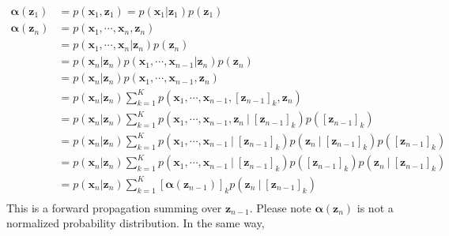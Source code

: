 \documentclass[a4]{article}
\begin{document}
\begin{equation}
\begin{aligned}
\bm{\alpha}(\bm{z}_1) &= p(\bm{x}_1, \bm{z}_1) = p(\bm{x}_1|\bm{z}_1)p(\bm{z}_1)\\
\bm{\alpha}(\bm{z}_n) &= p(\bm{x}_1, \cdots, \bm{x}_n , \bm{z}_n)\\
                      &= p(\bm{x}_1, \cdots, \bm{x}_n | \bm{z}_n)p(\bm{z}_n)\\
                      &= p(\bm{x}_{n}|\bm{z}_n) p(\bm{x}_1, \cdots, \bm{x}_{n-1}| \bm{z}_n)p(\bm{z}_n)\\
                      &= p(\bm{x}_{n}|\bm{z}_n) p(\bm{x}_1, \cdots, \bm{x}_{n-1}, \bm{z}_n)\\
                      &= p(\bm{x}_{n}|\bm{z}_n) 
                         \sum_{k=1}^K p(\bm{x}_1, \cdots, \bm{x}_{n-1}, [\bm{z}_{n-1}]_k, \bm{z}_n )\\
                      &= p( \bm{x}_{n} | \bm{z}_n ) 
                         \sum_{k=1}^K p( \bm{x}_1, \cdots, \bm{x}_{n-1}, \bm{z}_n \:|\: [\bm{z}_{n-1}]_k )
                         p( [\bm{z}_{n-1}]_k )\\
                      &= p( \bm{x}_{n} | \bm{z}_n ) 
                         \sum_{k=1}^K p( \bm{x}_1, \cdots, \bm{x}_{n-1} \:|\: [\bm{z}_{n-1}]_k )
                                      p( \bm{z}_n \:|\: [\bm{z}_{n-1}]_k )
                         p( [\bm{z}_{n-1}]_k )\\
                      &= p( \bm{x}_{n} | \bm{z}_n ) 
                         \sum_{k=1}^K p( \bm{x}_1, \cdots, \bm{x}_{n-1}\: |\: [\bm{z}_{n-1}]_k )p( [\bm{z}_{n-1}]_k )
                                      p( \bm{z}_n \:|\: [\bm{z}_{n-1}]_k )\\
                      &= p( \bm{x}_{n} | \bm{z}_n ) 
                         \sum_{k=1}^K [\bm{\alpha}(\bm{z}_{n-1})]_k p( \bm{z}_n \:|\ [\bm{z}_{n-1}]_k )\label{eq:definition_alpha}\\
\end{aligned}
\end{equation}
This is a forward propagation summing over $\bm{z}_{n-1}$.
Please note $\bm{\alpha}(\bm{z}_n)$ is not a normalized probability distribution.
In the same way, 
\end{document}
